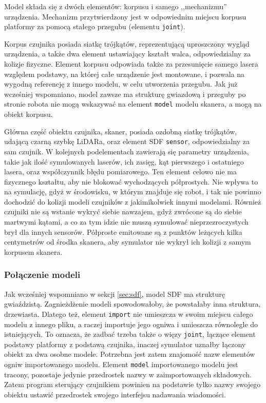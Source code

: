 		Model składa się z dwóch elementów: korpusu i samego ,,mechanizmu'' urządzenia.
		Mechanizm przytwierdzony jest w odpowiednim miejscu korpusu platformy za pomocą stałego przegubu (elementu \texttt{joint}).

		Korpus czujnika posiada siatkę trójkątów, reprezentującą uproszczony wygląd urządzenia, a także dwa element ustawiający kształt walca, odpowiedzialny za kolizje fizyczne.
		Element korpusu odpowiada także za przesunięcie samego lasera względem podstawy, na której całe urządzenie jest montowane, i 
		pozwala na wygodną referencję z innego modelu, w celu utworzenia przegubu.
		Jak już wcześniej wspomniano, model zawsze ma strukturę gwiazdową i przeguby po stronie robota nie mogą wskazywać na element \texttt{model} modelu skanera, a mogą
		na obiekt korpusu.
		
		Główna część obiektu czujnika, skaner, posiada ozdobną siatkę trójkątów, udającą czarną szybkę LiDARa, oraz element SDF \texttt{sensor}, odpowiedzialny za sam czujnik.
		W kolejnych podelementach zawierają się parametry urządzenia, takie jak ilość symulowanych laserów, ich zasięg, kąt pierwszego i ostatniego lasera, oraz współczynnik błędu pomiarowego. Ten element celowo nie ma fizycznego kształtu, aby nie blokować wychodzących półprostych. 
		Nie wpływa to na symulację, gdyż w środowisku, w którym znajduje się robot, i tak nie powinno dochodzić do kolizji modeli czujników z jakimikolwiek innymi modelami.
		Również czujniki nie są wstanie wykryć siebie nawzajem, gdyż zwrócone są do siebie martwymi kątami, a co za tym idzie nie muszą symulować nieprzezroczystych brył dla
		innych sensorów.
		Półproste emitowane są z punktów leżących kilka centymetrów od środka skanera, aby symulator nie wykrył ich kolizji z samym korpusem skanera.

		\subsubsection{Połączenie modeli}
			Jak wcześniej wspomniano w sekcji \ref{sec:sdf},
			model SDF ma strukturę gwiaździstą. 
			Zagnieżdżenie modeli spowodowałoby, że powstałaby inna struktura, drzewiasta.
			Dlatego też, element \texttt{import} nie umieszcza w swoim miejscu całego modelu z innego pliku, a raczej importuje jego ogniwa i umieszcza równolegle do istniejących.
			To oznacza, że zadbać trzeba także o więzy \texttt{joint}, łączące element podstawy platformy z podstawą czujnika, inaczej symulator uznałby łączony obiekt za dwa osobne modele.
			Potrzebna jest zatem znajomość nazw elementów ogniw importowanego modelu.
			Element \texttt{model} importowanego modelu jest tracony, pozostaje jedynie przedrostek nazwy w zaimportowanych składowych.
			Zatem program sterujący czujnikiem powinien na podstawie tylko nazwy swojego obiektu ustawić przedrostek swojego interfejsu nadawania wiadomości.


